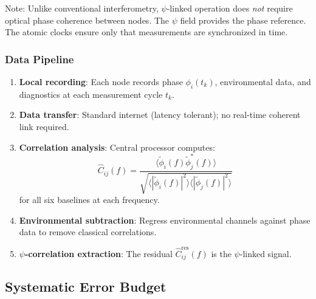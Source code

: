 \documentclass[12pt,a4paper]{article}
\theoremstyle{remark}
\begin{document}
Note: Unlike conventional interferometry, $\psi$-linked operation does
\emph{not} require optical phase coherence between nodes. The $\psi$ field
provides the phase reference. The atomic clocks ensure only that
measurements are synchronized in time.

\subsubsection{Data Pipeline}

\begin{enumerate}
\item \textbf{Local recording}: Each node records phase $\phi_i(t_k)$,
environmental data, and diagnostics at each measurement cycle $t_k$.
\item \textbf{Data transfer}: Standard internet (latency tolerant);
no real-time coherent link required.
\item \textbf{Correlation analysis}: Central processor computes:
\begin{equation}
\hat{C}_{ij}(f) = \frac{\langle\tilde{\phi}_i(f)\tilde{\phi}_j^*(f)\rangle}{\sqrt{\langle|\tilde{\phi}_i(f)|^2\rangle\langle|\tilde{\phi}_j(f)|^2\rangle}}
\end{equation}
for all six baselines at each frequency.
\item \textbf{Environmental subtraction}: Regress environmental channels
against phase data to remove classical correlations.
\item \textbf{$\psi$-correlation extraction}: The residual $\hat{C}_{ij}^{\text{res}}(f)$
is the $\psi$-linked signal.
\end{enumerate}

\subsection{Systematic Error Budget}\label{sec:systematics}
\end{document}
